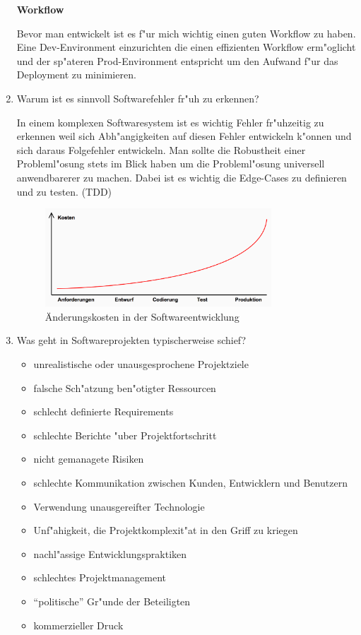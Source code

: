 \begin{enumerate}
\textbf{Workflow}

Bevor man entwickelt ist es f"ur mich wichtig einen guten Workflow zu haben. Eine Dev-Environment einzurichten die einen effizienten Workflow erm"oglicht und der sp"ateren Prod-Environment entspricht um den Aufwand f"ur das Deployment zu minimieren.


\item Warum ist es sinnvoll Softwarefehler fr"uh zu erkennen?
\smallbreak

In einem komplexen Softwaresystem ist es wichtig Fehler fr"uhzeitig zu erkennen weil sich Abh"angigkeiten auf diesen Fehler entwickeln k"onnen und sich daraus Folgefehler entwickeln. Man sollte die Robustheit einer Probleml"osung stets im Blick haben um die Probleml"osung universell anwendbarerer zu machen. Dabei ist es wichtig die Edge-Cases zu definieren und zu testen. (TDD)
\begin{figure}[H]
  \centering
  \includegraphics[width=0.8\textwidth]{./images/Aenderungskosten.png}
  \captionsetup{name=Abb.,font=footnotesize}
  \caption{Änderungskosten in der Softwareentwicklung}
\end{figure}

\newpage
\item Was geht in Softwareprojekten typischerweise schief?

\begin{itemize}
\item unrealistische oder unausgesprochene Projektziele
\item falsche Sch"atzung ben"otigter Ressourcen
\item schlecht definierte Requirements
\item schlechte Berichte "uber Projektfortschritt
\item nicht gemanagete Risiken
\item schlechte Kommunikation zwischen Kunden, Entwicklern und Benutzern
\item Verwendung unausgereifter Technologie
\item Unf"ahigkeit, die Projektkomplexit"at in den Griff zu kriegen
\item nachl"assige Entwicklungspraktiken
\item schlechtes Projektmanagement
\item ``politische'' Gr"unde der Beteiligten
\item kommerzieller Druck
\end{itemize}



\end{enumerate}
